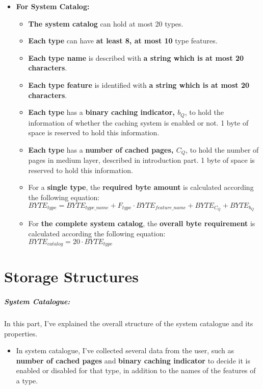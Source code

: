 \documentclass[12pt]{report}
\begin{document}
\begin{itemize}
\item{\large \textbf{For System Catalog:}}
\begin{itemize}
\item \textbf{The system catalog} can hold at most 20 types.
\item \textbf{Each type} can have \textbf{at least 8, at most 10} type features.
\item \textbf{Each type name} is described with \textbf{a string which is at most 20 characters}.
\item \textbf{Each type feature} is identified with \textbf{a string which is at most 20 characters}.
\item \textbf{Each type} has a \textbf{binary caching indicator, $b_{Q}$}, to hold the information of whether the caching system is enabled or not. 1 byte of space is reserved to hold this information.
\item \textbf{Each type} has a \textbf{number of cached pages, $C_{Q}$}, to hold the number of pages in medium layer, described in introduction part. 1 byte of space is reserved to hold this information.
\item For a \textbf{single type}, the \textbf{required byte amount} is calculated according the following equation: \\
$BYTE_{type} = BYTE_{type\_name} + F_{type}\cdot{BYTE_{feature\_name}} + BYTE_{C_{Q}} + BYTE_{b_{Q}}$ 
\item For \textbf{the complete system catalog}, the \textbf{overall byte requirement} is calculated according the following equation: \\
$BYTE_{catalog} = 20 \cdot BYTE_{type}$
\end{itemize}
\end{itemize}

\chapter{Storage Structures}
\paragraph{System Catalogue:}
In this part, I've explained the overall structure of the system catalogue and its properties. \\	

\begin{itemize}
\item In system catalogue, I've collected several data from the user, such as \textbf{number of cached pages} and \textbf{binary caching indicator} to decide it is enabled or disabled for that type, in addition to the names of the features of a type.
\end{itemize}
\end{document}
